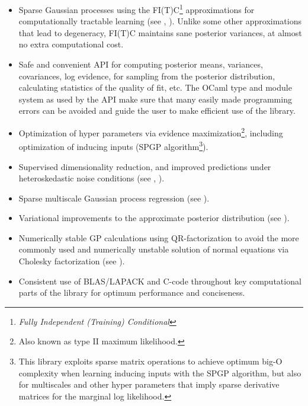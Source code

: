 \documentclass[10pt]{report}
\begin{document}
\begin{itemize}

\item Sparse Gaussian processes using the FI(T)C\footnote{\emph{Fully
Independent (Training) Conditional}} approximations for computationally
tractable learning (see \cite{conf/nips/2005}, \cite{SnelsonThesis}).  Unlike
some other approximations that lead to degeneracy, FI(T)C maintains sane
posterior variances, at almost no extra computational cost.

\item Safe and convenient API for computing posterior means, variances,
covariances, log evidence, for sampling from the posterior distribution,
calculating statistics of the quality of fit, etc.  The OCaml type and module
system as used by the API make sure that many easily made programming errors can
be avoided and guide the user to make efficient use of the library.

\item Optimization of hyper parameters via evidence maximization\footnote{Also
known as type II maximum likelihood.}, including optimization of inducing inputs
(SPGP algorithm\footnote{This library exploits sparse matrix operations to
achieve optimum big-O complexity when learning inducing inputs with the SPGP
algorithm, but also for multiscales and other hyper parameters that imply sparse
derivative matrices for the marginal log likelihood.}).

\item Supervised dimensionality reduction, and improved predictions under
heteroskedastic noise conditions (see \cite{conf/uai/SnelsonG06},
\cite{SnelsonThesis}).

\item Sparse multiscale Gaussian process regression (see
\cite{conf/icml/WalderKS08}).

\item Variational improvements to the approximate posterior distribution (see
\cite{Titsias2009}).

\item Numerically stable GP calculations using QR-factorization to avoid the
more commonly used and numerically unstable solution of normal equations via
Cholesky factorization (see \cite{Foster2009}).

\item Consistent use of BLAS/LAPACK and C-code throughout key computational
parts of the library for optimum performance and conciseness.


\end{itemize}
\end{document}
